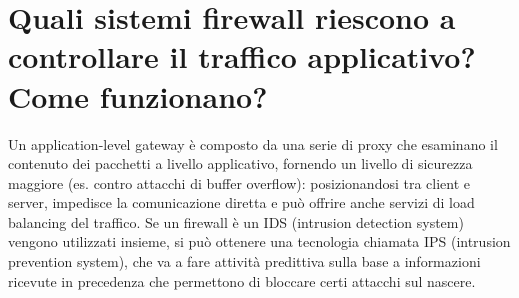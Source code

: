 \documentclass{report}
\begin{document}
\section{Quali sistemi firewall riescono a controllare il traffico applicativo? Come funzionano?}
Un application-level gateway è composto da una serie di proxy che esaminano il contenuto dei pacchetti a livello applicativo, fornendo un livello di sicurezza maggiore (es. contro attacchi di buffer overflow): posizionandosi tra client e server, impedisce la comunicazione diretta e può offrire anche servizi di load balancing del traffico.
Se un firewall è un IDS (intrusion detection system) vengono utilizzati insieme, si può ottenere una tecnologia chiamata IPS (intrusion prevention system), che va a fare attività predittiva sulla base a informazioni ricevute in precedenza che permettono di bloccare certi attacchi sul nascere.
\end{document}
